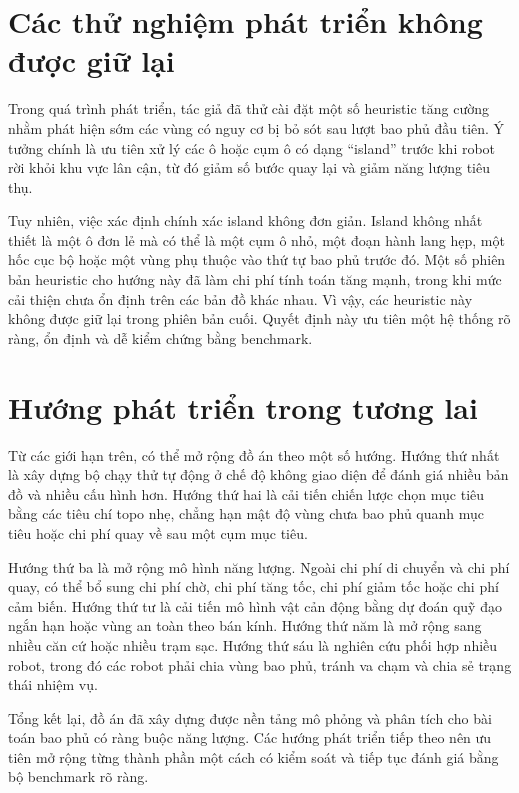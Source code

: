 \documentclass[../DoAn.tex]{subfiles}
\begin{document}
\section{Các thử nghiệm phát triển không được giữ lại}

Trong quá trình phát triển, tác giả đã thử cài đặt một số heuristic tăng cường nhằm phát hiện sớm các vùng có nguy cơ bị bỏ sót sau lượt bao phủ đầu tiên. Ý tưởng chính là ưu tiên xử lý các ô hoặc cụm ô có dạng ``island'' trước khi robot rời khỏi khu vực lân cận, từ đó giảm số bước quay lại và giảm năng lượng tiêu thụ.

Tuy nhiên, việc xác định chính xác island không đơn giản. Island không nhất thiết là một ô đơn lẻ mà có thể là một cụm ô nhỏ, một đoạn hành lang hẹp, một hốc cục bộ hoặc một vùng phụ thuộc vào thứ tự bao phủ trước đó. Một số phiên bản heuristic cho hướng này đã làm chi phí tính toán tăng mạnh, trong khi mức cải thiện chưa ổn định trên các bản đồ khác nhau. Vì vậy, các heuristic này không được giữ lại trong phiên bản cuối. Quyết định này ưu tiên một hệ thống rõ ràng, ổn định và dễ kiểm chứng bằng benchmark.

\section{Hướng phát triển trong tương lai}

Từ các giới hạn trên, có thể mở rộng đồ án theo một số hướng. Hướng thứ nhất là xây dựng bộ chạy thử tự động ở chế độ không giao diện để đánh giá nhiều bản đồ và nhiều cấu hình hơn. Hướng thứ hai là cải tiến chiến lược chọn mục tiêu bằng các tiêu chí topo nhẹ, chẳng hạn mật độ vùng chưa bao phủ quanh mục tiêu hoặc chi phí quay về sau một cụm mục tiêu.

Hướng thứ ba là mở rộng mô hình năng lượng. Ngoài chi phí di chuyển và chi phí quay, có thể bổ sung chi phí chờ, chi phí tăng tốc, chi phí giảm tốc hoặc chi phí cảm biến. Hướng thứ tư là cải tiến mô hình vật cản động bằng dự đoán quỹ đạo ngắn hạn hoặc vùng an toàn theo bán kính. Hướng thứ năm là mở rộng sang nhiều căn cứ hoặc nhiều trạm sạc. Hướng thứ sáu là nghiên cứu phối hợp nhiều robot, trong đó các robot phải chia vùng bao phủ, tránh va chạm và chia sẻ trạng thái nhiệm vụ.

Tổng kết lại, đồ án đã xây dựng được nền tảng mô phỏng và phân tích cho bài toán bao phủ có ràng buộc năng lượng. Các hướng phát triển tiếp theo nên ưu tiên mở rộng từng thành phần một cách có kiểm soát và tiếp tục đánh giá bằng bộ benchmark rõ ràng.
\end{document}
